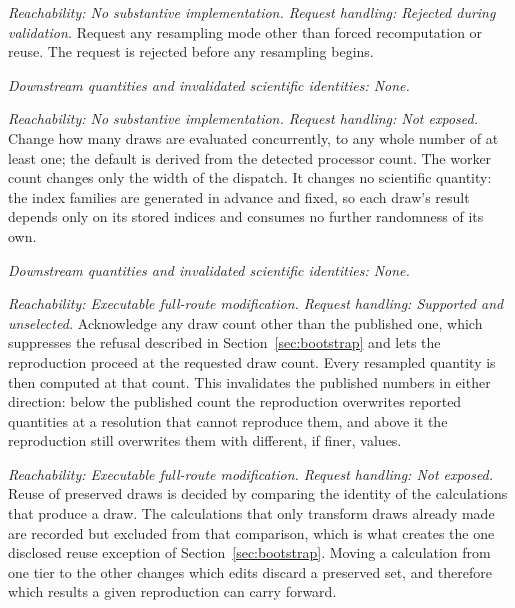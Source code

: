 \documentclass[11pt]{article}
\begin{document}
\begin{description}[style=nextline]
\item[Unrecognized resampling-mode request.]
\emph{Reachability: No substantive implementation. Request handling: Rejected during validation.}
Request any resampling mode other than forced recomputation or reuse. The request is rejected before
any resampling begins.

\emph{Downstream quantities and invalidated scientific identities: None.}

\item[Resampling worker count.]
\emph{Reachability: No substantive implementation. Request handling: Not exposed.}
Change how many draws are evaluated concurrently, to any whole number of at least one; the default
is derived from the detected processor count. The worker count changes only the width of the
dispatch. It changes no scientific quantity: the index families are generated in advance and fixed, so each
draw's result depends only on its stored indices and consumes no further randomness of its own.

\emph{Downstream quantities and invalidated scientific identities: None.}

\item[Nondefault-resolution acknowledgment.]
\emph{Reachability: Executable full-route modification. Request handling: Supported and unselected.}
Acknowledge any draw count other than the published one, which suppresses the refusal described in
Section~\ref{sec:bootstrap} and lets the reproduction proceed at the requested draw count.
Every resampled quantity is then computed at that count. This invalidates the
published numbers in either direction: below the published count the reproduction overwrites
reported quantities at a resolution that cannot reproduce them, and above it the reproduction still
overwrites them with different, if finer, values.

\item[Reclassification of a calculation between the draw and presentation tiers.]
\emph{Reachability: Executable full-route modification. Request handling: Not exposed.}
Reuse of preserved draws is decided by comparing the identity of the calculations that produce a
draw. The calculations that only transform draws already made are recorded but excluded from that
comparison, which is what creates the one disclosed reuse exception of
Section~\ref{sec:bootstrap}. Moving a calculation from one tier to the other changes which edits
discard a preserved set, and therefore which results a given reproduction can carry forward.
\end{description}
\end{document}
